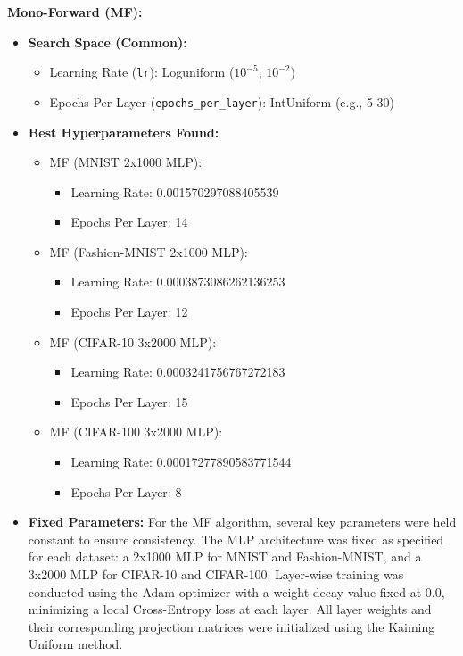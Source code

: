 \documentclass[11pt, english]{article}
\begin{document}
\textbf{Mono-Forward (MF):}
\begin{itemize}
    \item \textbf{Search Space (Common):}
        \begin{itemize}
            \item Learning Rate (\texttt{lr}): Loguniform ($10^{-5}$, $10^{-2}$)
            \item Epochs Per Layer (\texttt{epochs\_per\_layer}): IntUniform (e.g., 5-30)
        \end{itemize}
    \item \textbf{Best Hyperparameters Found:}
        \begin{itemize}
            \item MF (MNIST 2x1000 MLP):
                \begin{itemize}
                    \item Learning Rate: 0.001570297088405539
                    \item Epochs Per Layer: 14 
                \end{itemize}
            \item MF (Fashion-MNIST 2x1000 MLP):
                \begin{itemize}
                    \item Learning Rate: 0.0003873086262136253
                    \item Epochs Per Layer: 12 
                \end{itemize}
            \item MF (CIFAR-10 3x2000 MLP):
                \begin{itemize}
                    \item Learning Rate: 0.0003241756767272183
                    \item Epochs Per Layer: 15 
                \end{itemize}
            \item MF (CIFAR-100 3x2000 MLP):
                \begin{itemize}
                    \item Learning Rate: 0.00017277890583771544
                    \item Epochs Per Layer: 8 
                \end{itemize}
        \end{itemize}
    \item \textbf{Fixed Parameters:} For the MF algorithm, several key parameters were held constant to ensure consistency. The MLP architecture was fixed as specified for each dataset: a 2x1000 MLP for MNIST and Fashion-MNIST, and a 3x2000 MLP for CIFAR-10 and CIFAR-100. Layer-wise training was conducted using the Adam optimizer with a weight decay value fixed at 0.0, minimizing a local Cross-Entropy loss at each layer. All layer weights and their corresponding projection matrices were initialized using the Kaiming Uniform method.
\end{itemize}
\end{document}
